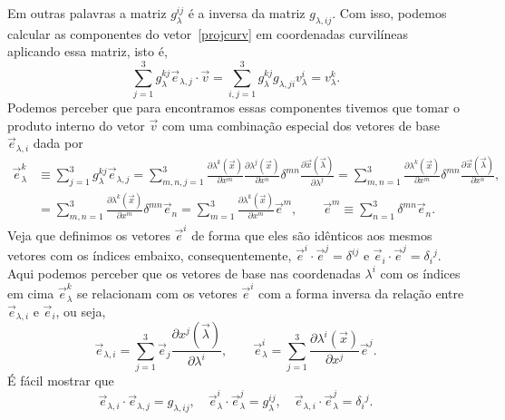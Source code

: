 Em outras palavras a matriz $g_\lambda^{ij}$ é a inversa da matriz
$g_{\lambda,ij}$. Com isso, podemos calcular as componentes do
vetor~\eqref{projcurv} em coordenadas curvilíneas  aplicando essa matriz, isto
é,
\begin{equation}
	\sum_{j=1}^3 g_\lambda^{kj}\vec{e}_{\lambda,j}\cdot\vec{v} = \sum_{i,j=1}^3 g_\lambda^{kj}g_{\lambda,ji}v_\lambda^{i} = v_\lambda^k.
\end{equation}
Podemos perceber que para encontramos essas componentes tivemos que tomar o
produto interno do vetor $\vec{v}$ com uma combinação especial dos vetores de base
$ \vec{e}_{\lambda,i} $ dada por
\begin{equation}\label{defecv}
	\begin{split}
		\vec{e}_\lambda^k & \equiv \sum_{j=1}^3 g_\lambda^{kj}\vec{e}_{\lambda,j} = \sum_{m,n,j=1}^3 \frac{\partial \lambda^k(\vec{x})}{\partial x^m}\frac{\partial \lambda^j(\vec{x})}{\partial x^n}\delta^{mn}\frac{\partial \vec{x}(\vec{\lambda})}{\partial \lambda^j} = \sum_{m,n=1}^3 \frac{\partial \lambda^k(\vec{x})}{\partial x^m}\delta^{mn}\frac{\partial \vec{x}(\vec{\lambda})}{\partial x^n}, \\
		                  & =\sum_{m,n=1}^3 \frac{\partial \lambda^k(\vec{x})}{\partial x^m}\delta^{mn}\vec{e}_n =\sum_{m=1}^3 \frac{\partial \lambda^k(\vec{x})}{\partial x^m}\vec{e}^m, \qquad \vec{e}^m \equiv \sum_{n=1}^3\delta^{mn}\vec{e}_n.
	\end{split}
\end{equation}
Veja que definimos os vetores $\vec{e}^i$ de forma que eles são idênticos aos
mesmos vetores com os índices embaixo, consequentemente,
$\vec{e}^i\cdot\vec{e}^j = \delta^{ij}$ e $\vec{e}_i\cdot\vec{e}^j =
	\delta_i{}^j$. Aqui podemos perceber que os vetores de base nas coordenadas
$\lambda^i$ com os índices em cima  $\vec{e}_\lambda^k$ se relacionam com os
vetores $\vec{e}^i$ com a forma inversa da relação entre $\vec{e}_{\lambda,i}$ e
$\vec{e}_i$, ou seja,
\begin{equation}\label{defeli}
	\vec{e}_{\lambda,i} = \sum_{j=1}^3\vec{e}_j\frac{\partial x^j(\vec{\lambda})}{\partial \lambda^i}, \qquad \vec{e}_\lambda^i = \sum_{j=1}^3 \frac{\partial \lambda^i(\vec{x})}{\partial x^j}\vec{e}^j.
\end{equation}
É fácil mostrar que
\begin{equation}\label{bases}
	\vec{e}_{\lambda,i}\cdot\vec{e}_{\lambda,j} = g_{\lambda,ij}, \quad \vec{e}_{\lambda}^i\cdot\vec{e}_{\lambda}^j = g_{\lambda}^{ij}, \quad \vec{e}_{\lambda,i}\cdot\vec{e}_{\lambda}^j = \delta_{i}{}^j.
\end{equation}
